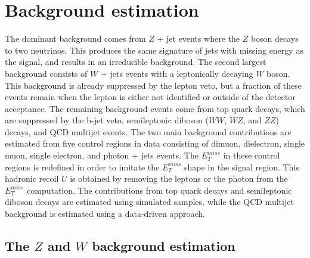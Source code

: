 \section{Background estimation}
\label{sec:bkgd}

% 

The dominant background comes from $Z$ + jet events where the $Z$ boson decays to two neutrinos. This produces the same signature of jets with missing energy as the signal, and results in an irreducible background. The second largest background consists of $W$ + jets events with a leptonically decaying $W$ boson. This background is already suppressed by the lepton veto, but a fraction of these events remain when the lepton is either not identified or outside of the detector acceptance. The remaining background events come from top quark decays, which are suppressed by the b-jet veto, semileptonic diboson ($WW$, $WZ$, and $ZZ$) decays, and QCD multijet events. The two main background contributions are estimated from five control regions in data consisting of dimuon, dielectron, single muon, single electron, and photon + jets events. The $E_T^{miss}$ in these control regions is redefined in order to imitate the $E_T^{miss}$ shape in the signal region. This hadronic recoil $U$ is obtained by removing the leptons or the photon from the $E_T^{miss}$ computation. The contributions from top quark decays and semileptonic diboson decays are estimated using simulated samples, while the QCD multijet background is estimated using a data-driven approach.

\subsection{The \boldmath$Z$ and \boldmath$W$ background estimation}

